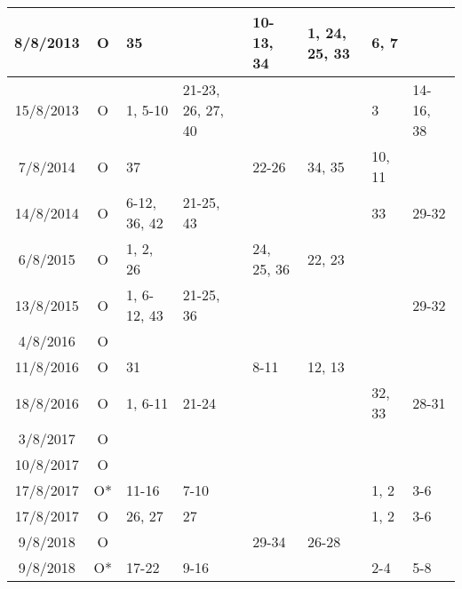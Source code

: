\begin{longtable}{|c|c|p{1.85cm}|p{1.85cm}|p{1.85cm}|p{1.85cm}|p{1.85cm}|p{1.85cm}|}
\hline
    8/8/2013    &
    O    &
    \raggedright 35 &
	\raggedright &
	\raggedright 10-13, 34 &
	\raggedright 1, 24, 25, 33 &
	\raggedright 6, 7 &
	\raggedright 
	\tabularnewline
\hline
    15/8/2013    &
    O    &
    \raggedright 1, 5-10 &
	\raggedright 21-23, 26, 27, 40 &
	\raggedright &
	\raggedright &
	\raggedright 3 &
	\raggedright 14-16, 38
	\tabularnewline
\hline
    7/8/2014    &
    O    &
    \raggedright 37 &
	\raggedright &
	\raggedright 22-26 &
	\raggedright 34, 35 &
	\raggedright 10, 11 &
	\raggedright 
	\tabularnewline
\hline
    14/8/2014    &
    O    &
    \raggedright 6-12, 36, 42 &
	\raggedright 21-25, 43 &
	\raggedright &
	\raggedright &
	\raggedright 33 &
	\raggedright 29-32
	\tabularnewline
\hline
    6/8/2015    &
    O    &
    \raggedright 1, 2, 26 &
	\raggedright &
	\raggedright 24, 25, 36 &
	\raggedright 22, 23 &
	\raggedright &
	\raggedright 
	\tabularnewline
\hline
    13/8/2015    &
    O    &
    \raggedright 1, 6-12, 43 &
	\raggedright 21-25, 36 &
	\raggedright &
	\raggedright &
	\raggedright &
	\raggedright 29-32
	\tabularnewline
\hline
    4/8/2016    &
    O    &
    \raggedright &
	\raggedright &
	\raggedright &
	\raggedright &
	\raggedright &
	\raggedright 
	\tabularnewline
\hline
    11/8/2016    &
    O    &
    \raggedright 31 &
	\raggedright &
	\raggedright 8-11 &
	\raggedright 12, 13 &
	\raggedright &
	\raggedright 
	\tabularnewline
\hline
    18/8/2016    &
    O    &
    \raggedright 1, 6-11 &
	\raggedright 21-24 &
	\raggedright &
	\raggedright &
	\raggedright 32, 33 &
	\raggedright 28-31
	\tabularnewline
\hline
    3/8/2017    &
    O    &
    \raggedright &
	\raggedright &
	\raggedright &
	\raggedright &
	\raggedright &
	\raggedright 
	\tabularnewline
\hline
    10/8/2017    &
    O    &
    \raggedright &
	\raggedright &
	\raggedright &
	\raggedright &
	\raggedright &
	\raggedright 
	\tabularnewline
\hline
    17/8/2017    &
    O*    &
    \raggedright 11-16 &
	\raggedright 7-10 &
	\raggedright &
	\raggedright &
	\raggedright 1, 2 &
	\raggedright 3-6
	\tabularnewline
\hline
    17/8/2017    &
    O    &
    \raggedright 26, 27 &
	\raggedright 27 &
	\raggedright &
	\raggedright &
	\raggedright 1, 2 &
	\raggedright 3-6
	\tabularnewline
\hline
    9/8/2018    &
    O    &
    \raggedright &
	\raggedright &
	\raggedright 29-34 &
	\raggedright 26-28 &
	\raggedright &
	\raggedright 
	\tabularnewline
\hline
    9/8/2018    &
    O*    &
    \raggedright 17-22 &
	\raggedright 9-16 &
	\raggedright &
	\raggedright &
	\raggedright 2-4 &
	\raggedright 5-8
	\tabularnewline
\hline

\end{longtable}









